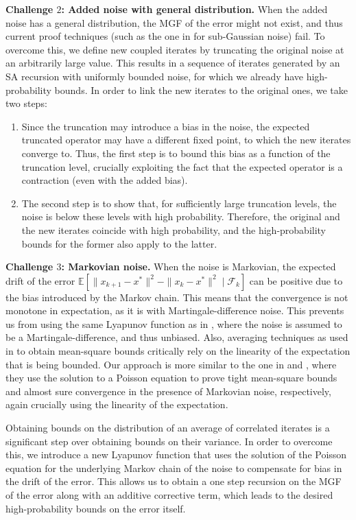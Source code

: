 \documentclass{article}
\begin{document}
\textbf{Challenge $2$: Added noise with general distribution.} When the added noise has a general distribution, the MGF of the error might not exist, and thus current proof techniques (such as the one in \citet{chen2025concentration} for sub-Gaussian noise) fail. To overcome this, we define new coupled iterates by truncating the original noise at an arbitrarily large value. This results in a sequence of iterates generated by an SA recursion with uniformly bounded noise, for which we already have high-probability bounds. In order to link the new iterates to the original ones, we take two steps:
\begin{enumerate}
    \item Since the truncation may introduce a bias in the noise, the expected truncated operator may have a different fixed point, to which the new iterates converge to. Thus, the first step is to bound this bias as a function of the truncation level, crucially exploiting the fact that the expected operator is a contraction (even with the added bias).
    \item The second step is to show that, for sufficiently large truncation levels, the noise is below these levels with high probability. Therefore, the original and the new iterates coincide with high probability, and the high-probability bounds for the former also apply to the latter.
\end{enumerate}

\textbf{Challenge $3$: Markovian noise.} When the noise is Markovian, the expected drift of the error $\mathbb{E}[\| x_{k+1}-x^*\|^2 - \| x_{k}-x^*\|^2 \mid \mathcal{F}_k]$ can be positive due to the bias introduced by the Markov chain. This means that the convergence is not monotone in expectation, as it is with Martingale-difference noise. This prevents us from using the same Lyapunov function as in \citet{chen2025concentration}, where the noise is assumed to be a Martingale-difference, and thus unbiased. Also, averaging techniques as used in \citet{srikant2019finite} to obtain mean-square bounds critically rely on the linearity of the expectation that is being bounded. {Our approach is more similar to the one in \citet{haque2024stochastic} and \cite{liu2026almost}, where they use the solution to a Poisson equation to prove tight mean-square bounds and almost sure convergence in the presence of Markovian noise, respectively, again crucially using the linearity of the expectation.}

Obtaining bounds on the distribution of an average of correlated iterates is a significant step over obtaining bounds on their variance. In order to overcome this, we introduce a new Lyapunov function that uses the solution of the Poisson equation for the underlying Markov chain of the noise to compensate for bias in the drift of the error. This allows us to obtain a one step recursion on the MGF of the error along with an additive corrective term, which leads to the desired high-probability bounds on the error itself. 
\end{document}
